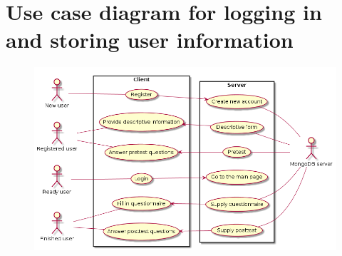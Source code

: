 \chapter{Use case diagram for logging in and storing user information}
\label{app:loginusecase}
\begin{figure}[h!]
\centering
\includegraphics[width=\textwidth]{img/loginusecase.png}
\end{figure}

